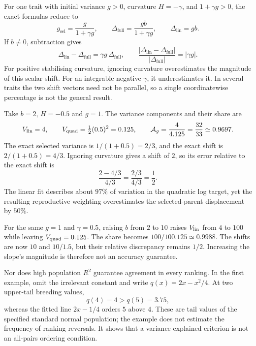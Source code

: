 For one trait with initial variance $g>0$, curvature $H=-\gamma$, and
$1+\gamma g>0$, the exact formulas reduce to
\begin{equation}
g_{\mathrm{sel}}=\frac{g}{1+\gamma g},
\qquad
\Delta_{\mathrm{full}}=\frac{gb}{1+\gamma g},
\qquad \Delta_{\mathrm{lin}}=gb.
\label{selection:scalar_moments}
\end{equation}
If $b\ne0$, subtraction gives
\begin{equation}
\Delta_{\mathrm{lin}}-\Delta_{\mathrm{full}}
 =\gamma g\,\Delta_{\mathrm{full}},
\qquad
\frac{|\Delta_{\mathrm{lin}}-\Delta_{\mathrm{full}}|}
     {|\Delta_{\mathrm{full}}|}=|\gamma g|.
\label{selection:scalar_relative_error}
\end{equation}
For positive stabilising curvature, ignoring curvature overestimates the magnitude
of this scalar shift. For an integrable negative $\gamma$, it
underestimates it. In several traits the two shift vectors need not be
parallel, so a single coordinatewise percentage is not the general result.

\begin{example}
\label{selection:97_50_example}
Take $b=2$, $H=-0.5$ and $g=1$. The variance components and their share
are
\[
V_{\mathrm{lin}}=4,\qquad V_{\mathrm{quad}}=\tfrac12(0.5)^2=0.125,\qquad
\mathcal A_g=\frac{4}{4.125}=\frac{32}{33}\simeq0.9697.
\]
The exact selected variance is $1/(1+0.5)=2/3$, and the exact shift is
$2/(1+0.5)=4/3$. Ignoring curvature gives a shift of $2$, so its error
relative to the exact shift is
\[
\frac{2-4/3}{4/3}=\frac{2/3}{4/3}=\frac12.
\]
The linear fit describes about $97\%$ of variation in the quadratic log
target, yet the resulting reproductive weighting overestimates the
selected-parent displacement by $50\%$.
\end{example}

For the same $g=1$ and $\gamma=0.5$, raising $b$ from $2$ to $10$
raises $V_{\mathrm{lin}}$ from $4$ to $100$ while leaving $V_{\mathrm{quad}}=0.125$.
The share becomes $100/100.125\simeq0.9988$. The shifts are now $10$
and $10/1.5$, but their relative discrepancy remains $1/2$. Increasing
the slope's magnitude is therefore not an accuracy guarantee.

Nor does high population $R^2$ guarantee agreement in every ranking.
In the first example, omit the irrelevant constant and write
$q(x)=2x-x^2/4$. At two upper-tail breeding values,
\[
q(4)=4>q(5)=3.75,
\]
whereas the fitted line $2x-1/4$ orders $5$ above $4$.
These are tail values of the specified standard normal population; the
example does not estimate the frequency of ranking reversals. It shows
that a variance-explained criterion is not an all-pairs ordering condition.

